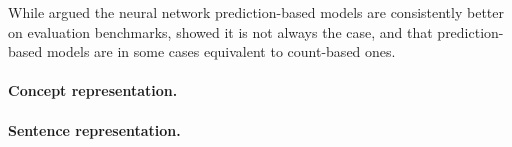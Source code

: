 \documentclass{article}
\begin{document}
    While \citet{baroni2014don} argued the neural network prediction-based models are
consistently better on evaluation benchmarks, \citet{levy2015improving} showed
it is not always the case, and that prediction-based models are in some cases
equivalent to count-based ones.

    \paragraph{Concept representation.}


    \paragraph{Sentence representation.}


    
    
\end{document}
